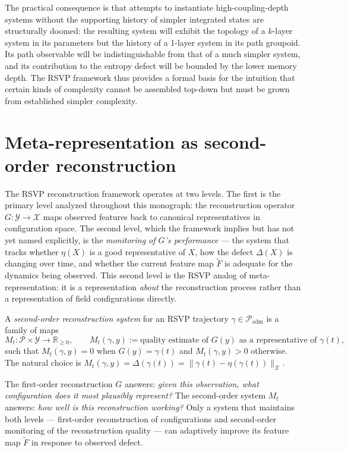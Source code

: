 \documentclass[12pt, oneside]{memoir}
\newcommand{\X}{\mathcal{X}}
\newcommand{\PP}{\mathcal{P}}
\newcommand{\Ft}{\widetilde{F}}
\newcommand{\Padm}{\mathcal{P}_{\mathrm{adm}}}
\newcommand{\nnorm}[1]{\lVert #1 \rVert}
\begin{document}
The practical consequence is that attempts to instantiate high-coupling-depth systems
without the supporting history of simpler integrated states are structurally doomed: the
resulting system will exhibit the topology of a $k$-layer system in its parameters but
the history of a 1-layer system in its path groupoid.  Its path observable will be
indistinguishable from that of a much simpler system, and its contribution to the
entropy defect will be bounded by the lower memory depth.  The RSVP framework thus
provides a formal basis for the intuition that certain kinds of complexity cannot be
assembled top-down but must be grown from established simpler complexity.

\section{Meta-representation as second-order reconstruction}
\label{sec:meta-repr}

The RSVP reconstruction framework operates at two levels.  The first is the primary
level analyzed throughout this monograph: the reconstruction operator $G: \mathcal{Y}
\to \X$ maps observed features back to canonical representatives in configuration space.
The second level, which the framework implies but has not yet named explicitly, is the
\emph{monitoring of $G$'s performance} — the system that tracks whether $\eta(X)$ is a
good representative of $X$, how the defect $\Delta(X)$ is changing over time, and
whether the current feature map $\Ft$ is adequate for the dynamics being observed.  This
second level is the RSVP analog of meta-representation: it is a representation
\emph{about} the reconstruction process rather than a representation of field
configurations directly.

\begin{definition}
\label{def:second-order}
A \emph{second-order reconstruction system} for an RSVP trajectory $\gamma \in \Padm$
is a family of maps
\[
  M_t: \PP \times \mathcal{Y} \to \mathbb{R}_{\geq 0},
  \qquad
  M_t(\gamma, y) := \text{quality estimate of } G(y) \text{ as a representative of }
  \gamma(t),
\]
such that $M_t(\gamma, y) = 0$ when $G(y) = \gamma(t)$ and $M_t(\gamma, y) > 0$
otherwise.  The natural choice is $M_t(\gamma, y) = \Delta(\gamma(t)) = \nnorm{\gamma(t)
- \eta(\gamma(t))}_\X$.
\end{definition}

The first-order reconstruction $G$ answers: \emph{given this observation, what
configuration does it most plausibly represent?}  The second-order system $M_t$ answers:
\emph{how well is this reconstruction working?}  Only a system that maintains both levels
— first-order reconstruction of configurations and second-order monitoring of the
reconstruction quality — can adaptively improve its feature map $\Ft$ in response to
observed defect.
\end{document}
